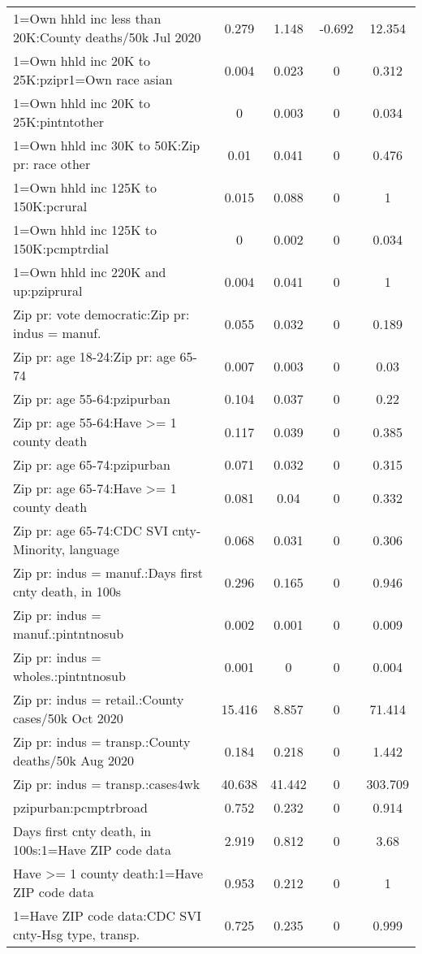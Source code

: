 {\begin{longtable}{l*{4}{c}}
 1=Own hhld inc less than 20K:County deaths/50k Jul 2020 & 0.279 & 1.148 & -0.692 & 12.354  \\ 
 1=Own hhld inc 20K to 25K:pzipr1=Own race asian & 0.004 & 0.023 & 0 & 0.312  \\ 
 1=Own hhld inc 20K to 25K:pintntother & 0 & 0.003 & 0 & 0.034  \\ 
 1=Own hhld inc 30K to 50K:Zip pr: race other & 0.01 & 0.041 & 0 & 0.476  \\ 
 1=Own hhld inc 125K to 150K:pcrural & 0.015 & 0.088 & 0 & 1  \\ 
 1=Own hhld inc 125K to 150K:pcmptrdial & 0 & 0.002 & 0 & 0.034  \\ 
 1=Own hhld inc 220K and up:pziprural & 0.004 & 0.041 & 0 & 1  \\ 
 Zip pr: vote democratic:Zip pr: indus = manuf. & 0.055 & 0.032 & 0 & 0.189  \\ 
 Zip pr: age 18-24:Zip pr: age 65-74 & 0.007 & 0.003 & 0 & 0.03  \\ 
 Zip pr: age 55-64:pzipurban & 0.104 & 0.037 & 0 & 0.22  \\ 
 Zip pr: age 55-64:Have >= 1 county death & 0.117 & 0.039 & 0 & 0.385  \\ 
 Zip pr: age 65-74:pzipurban & 0.071 & 0.032 & 0 & 0.315  \\ 
 Zip pr: age 65-74:Have >= 1 county death & 0.081 & 0.04 & 0 & 0.332  \\ 
 Zip pr: age 65-74:CDC SVI cnty-Minority, language & 0.068 & 0.031 & 0 & 0.306  \\ 
 Zip pr: indus = manuf.:Days first cnty death, in 100s & 0.296 & 0.165 & 0 & 0.946  \\ 
 Zip pr: indus = manuf.:pintntnosub & 0.002 & 0.001 & 0 & 0.009  \\ 
 Zip pr: indus = wholes.:pintntnosub & 0.001 & 0 & 0 & 0.004  \\ 
 Zip pr: indus = retail.:County cases/50k Oct 2020 & 15.416 & 8.857 & 0 & 71.414  \\ 
 Zip pr: indus = transp.:County deaths/50k Aug 2020 & 0.184 & 0.218 & 0 & 1.442  \\ 
 Zip pr: indus = transp.:cases4wk & 40.638 & 41.442 & 0 & 303.709  \\ 
 pzipurban:pcmptrbroad & 0.752 & 0.232 & 0 & 0.914  \\ 
 Days first cnty death, in 100s:1=Have ZIP code data & 2.919 & 0.812 & 0 & 3.68  \\ 
 Have >= 1 county death:1=Have ZIP code data & 0.953 & 0.212 & 0 & 1  \\ 
 1=Have ZIP code data:CDC SVI cnty-Hsg type, transp. & 0.725 & 0.235 & 0 & 0.999  \\ 
 \end{longtable}
}
\doublespacing
